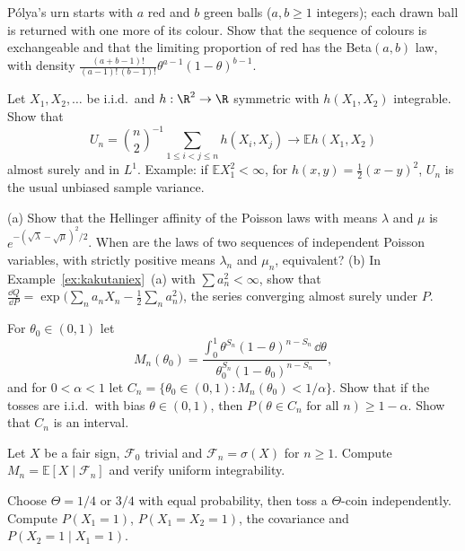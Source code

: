 \begin{exercise}[$\star\star$]\label{ex:polyabeta}
P\'olya's urn starts with $a$ red and $b$ green balls ($a,b\ge1$ integers); each drawn ball is returned with one more of its colour. Show that the sequence of colours is exchangeable and that the limiting proportion of
red has the Beta$(a,b)$ law, with density $\frac{(a+b-1)!}{(a-1)!\,(b-1)!}\theta^{a-1}(1-\theta)^{b-1}$.
\end{exercise}

\begin{exercise}[$\star\star$]\label{ex:ustat}
Let $X_1,X_2,\dots$ be i.i.d.\ and $h:\R^2\to\R$ symmetric with $h(X_1,X_2)$ integrable. Show that
\[
U_n=\binom n2^{-1}\sum_{1\le i<j\le n}h(X_i,X_j)\longrightarrow\mathbb Eh(X_1,X_2)
\]
almost surely and in $L^1$. Example: if $\mathbb EX_1^2<\infty$, for $h(x,y)=\frac12(x-y)^2$, $U_n$ is the usual unbiased sample variance.
\end{exercise}

\begin{exercise}[$\star\star$]\label{ex:kakutanipoisson}
(a) Show that the Hellinger affinity of the Poisson laws with means $\lambda$ and $\mu$ is $e^{-(\sqrt\lambda-\sqrt\mu)^2/2}$. When are the laws of two sequences of independent Poisson variables, with strictly positive means $\lambda_n$ and $\mu_n$, equivalent?
(b) In Example~\ref{ex:kakutaniex}~(a) with $\sum a_n^2<\infty$, show that $\frac{\dd Q}{\dd P}=\exp\bigl(\sum_na_nX_n-\frac12\sum_na_n^2\bigr)$, the series converging almost surely under $P$.
\end{exercise}

\begin{exercise}[$\star\star$]\label{ex:confseq}
For $\theta_0\in(0,1)$ let
\[
M_n(\theta_0)=\frac{\int_0^1\theta^{S_n}(1-\theta)^{n-S_n}\,\dd\theta}{\theta_0^{S_n}(1-\theta_0)^{n-S_n}},
\]
and for $0<\alpha<1$ let $C_n=\{\theta_0\in(0,1):M_n(\theta_0)<1/\alpha\}$. Show that if the tosses are i.i.d.\ with bias $\theta\in(0,1)$, then $P(\theta\in C_n\text{ for all }n)\ge1-\alpha$. Show that $C_n$ is an interval.
\end{exercise}

\begin{exercise}[$\star$]\label{ex:v11-ch09-final}
Let $X$ be a fair sign, $\mathcal F_0$ trivial and $\mathcal F_n=\sigma(X)$ for $n\ge1$. Compute $M_n=\mathbb E[X\mid\mathcal F_n]$ and verify uniform integrability.
\end{exercise}

\begin{exercise}[$\star\star$]\label{ex:v11-ch09-two-coins}
Choose $\Theta=1/4$ or $3/4$ with equal probability, then toss a $\Theta$-coin independently. Compute $P(X_1=1)$, $P(X_1=X_2=1)$, the covariance and $P(X_2=1\mid X_1=1)$.
\end{exercise}

